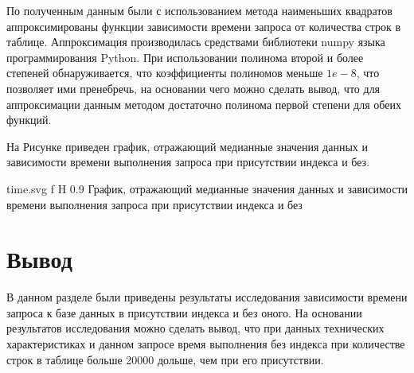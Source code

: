 По полученным данным были с использованием метода наименьших квадратов аппроксимированы функции зависимости времени запроса от количества строк в таблице. Аппроксимация производилась средствами библиотеки numpy языка программирования Python\cite{numpy}.
При использовании полинома второй и более степеней обнаруживается, что коэффициенты полиномов меньше $1e-8$, что позволяет ими пренебречь, на основании чего можно сделать вывод, что для аппроксимации данным методом достаточно полинома первой степени для обеих функций.

На Рисунке приведен график, отражающий медианные значения данных и зависимости времени выполнения запроса при присутствии индекса и без.

\myincludesvg
{time.svg} 
{f} 
{H} 
{0.9\textwidth} 
{График, отражающий медианные значения данных и зависимости времени выполнения запроса при присутствии индекса и без}

\section*{Вывод}

В данном разделе были приведены результаты исследования зависимости времени запроса к базе данных в присутствии индекса и без оного.
На основании результатов исследования можно сделать вывод, что при данных технических характеристиках и данном запросе время выполнения без индекса при количестве строк в таблице больше 20000 дольше, чем при его присутствии.
